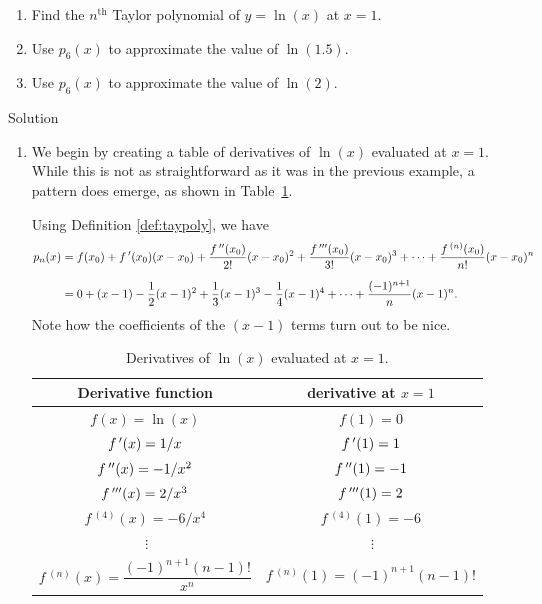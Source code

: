 \begin{example}\label{ex_taypoly2}
\begin{enumerate}
\item		Find the $n^\text{th}$ Taylor polynomial of $y=\ln(x)$ at $x=1$.
\item		Use $p_6(x)$ to approximate the value of $\ln(1.5)$.
\item		Use $p_6(x)$ to approximate the value of $\ln(2)$. 
\end{enumerate}

Solution 

\begin{enumerate}
\item		We begin by creating a table of derivatives of $\ln (x)$ evaluated at $x=1$. While this is not as straightforward as it was in the previous example, a pattern does emerge, as shown in Table~\ref{tab_series_1}.





Using Definition \ref{def:taypoly}, we have 
\begin{align*}
	p_n(x) &=	f(x_0) + f\,'(x_0)(x-x_0) + \frac{f\,''(x_0)}{2!}(x-x_0)^2+\frac{f\,'''(x_0)}{3!}(x-x_0)^3+\cdots+\frac{f\,^{(n)}(x_0)}{n!}(x-x_0)^n\\[0.2cm]
					&= 0+(x-1)-\frac12(x-1)^2+\frac13(x-1)^3-\frac14(x-1)^4+\cdots+\frac{(-1)^{n+1}}{n}(x-1)^n.
\end{align*}
\normalsize
Note how the coefficients of the $(x-1)$ terms turn out to be nice.

\begin{table}[H]
\caption{Derivatives of $\ln(x)$ evaluated at $x=1$.}
\label{tab_series_1}
\renewcommand{\arraystretch}{1.5}
\begin{tabular}{c|c}
Derivative function&derivative at $x=1$\\\hline
$f(x) = \ln(x) $&$f(1) = 0$\\%
$f\,'(x) = 1/x $&$f\,'(1) = 1$\\%
$f\,''(x) = -1/x^2 $&$f\,''(1) = -1$\\%
$f\,'''(x) = 2/x^3 $&$f\,'''(1) = 2$\\%
$f\,^{(4)}(x) = -6/x^4 $&$f\,^{(4)}(1) = -6$\\%
$\ \vdots $& $\ \vdots$\\%
$f\,^{(n)}(x) = \dfrac{(-1)^{n+1}(n-1)!}{x^n}$ & $f\,^{(n)}(1) = (-1)^{n+1}(n-1)!$\\
\end{tabular}
\renewcommand{\arraystretch}{1}
\end{table}



\end{enumerate}
\end{example}
